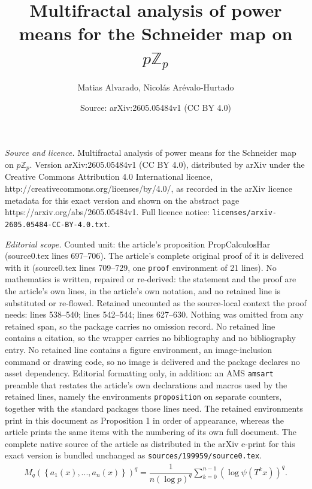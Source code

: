 \documentclass[10pt,a4paper]{amsart}
\title{Multifractal analysis of power means for the Schneider map on $p\mathbb{Z}_{p}$}
\author{Matias Alvarado, Nicol\'as Ar\'evalo-Hurtado}
\date{Source: arXiv:2605.05484v1 (CC BY 4.0)}
\begin{document}
\maketitle

\noindent\emph{Source and licence.} Multifractal analysis of power means for the Schneider map on $p\mathbb{Z}_{p}$. Version arXiv:2605.05484v1 (CC BY 4.0), distributed by arXiv under the Creative Commons Attribution 4.0 International licence, http://creativecommons.org/licenses/by/4.0/, as recorded in the arXiv licence metadata for this exact version and shown on the abstract page https://arxiv.org/abs/2605.05484v1. Full licence notice: \texttt{licenses/arxiv-2605.05484-CC-BY-4.0.txt}.\par\smallskip

\noindent\textit{Editorial scope.} Counted unit: the article's proposition PropCalculosHar (source0.tex lines 697--706). The article's complete original proof of it is delivered with it (source0.tex lines 709--729, one \texttt{proof} environment of 21 lines). No mathematics is written, repaired or re-derived: the statement and the proof are the article's own lines, in the article's own notation, and no retained line is substituted or re-flowed.  Retained uncounted as the source-local context the proof needs: lines 538--540; lines 542--544; lines 627--630.  Nothing was omitted from any retained span, so the package carries no omission record.  No retained line contains a citation, so the wrapper carries no bibliography and no bibliography entry.  No retained line contains a figure environment, an image-inclusion command or drawing code, so no image is delivered and the package declares no asset dependency.  Editorial formatting only, in addition: an AMS \texttt{amsart} preamble that restates the article's own declarations and macros used by the retained lines, namely the environments \texttt{proposition} on separate counters, together with the standard packages those lines need.  The retained environments print in this document as Proposition 1 in order of appearance, whereas the article prints the same items with the numbering of its own full document.  The complete native source of the article as distributed in the arXiv e-print for this exact version is bundled unchanged as \texttt{sources/199959/source0.tex}.
\begin{align}\label{QpowermeanP}
    M_{q}\left(\left\{a_1(x),...,a_n(x)\right\}\right)^{q}=\dfrac{1}{n(\log p)^{q}}\sum^{n-1}_{k=0}\left(\log \psi (T^{k}x)\right)^{q}.
\end{align}
\end{document}
